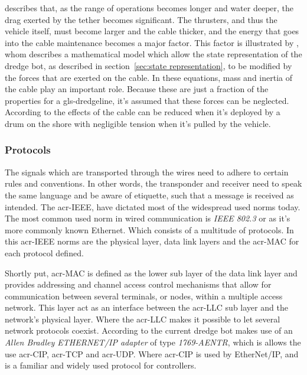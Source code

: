 \citet{westneat_advances_1983} describes that, as the range of operations becomes longer and water deeper, the drag exerted by the tether becomes significant. The thrusters, and thus the vehicle itself, must become larger and the cable thicker, and the energy that goes into the cable maintenance becomes a major factor. This factor is illustrated by \citet{fang_motions_2007}, whom describes a mathematical model which allow the state representation of the dredge bot, as described in section~\ref{sec:state representation}, to be modified by the forces that are exerted on the cable.
In these equations, mass and inertia of the cable play an important role. Because these are just a fraction of the properties for a \gls{gls-dredgeline}, it's assumed that these forces can be neglected. According to \citet{feng_evaluation_2004} the effects of the cable can be reduced when it's deployed by a drum on the shore with negligible tension when it's pulled by the vehicle.

\subsubsection*{Protocols}\label{sec:wired_protocols}
The signals which are transported through the wires need to adhere to certain rules and conventions. In other words, the transponder and receiver need to speak the same language and be aware of etiquette, such that a message is received as intended. The \gls{acr-IEEE}, have dictated most of the widespread used norms today. The most common used norm in wired communication is \textit{IEEE 802.3} or as it's more commonly known Ethernet. Which consists of a multitude of protocols. In this \gls{acr-IEEE} norms are the physical layer, data link layers and the \gls{acr-MAC} for each protocol defined.

Shortly put, \gls{acr-MAC} is defined as the lower sub layer of the data link layer and provides addressing and channel access control mechanisms that allow for communication between several terminals, or nodes, within a multiple access network. This layer act as an interface between the \gls{acr-LLC} sub layer and the network's physical layer. Where the \gls{acr-LLC} makes it possible to let several network protocols coexist.
According to \citet{jolectra_plc_2016} the current dredge bot makes use of an \textit{Allen Bradley ETHERNET/IP adapter} of type \textit{1769-AENTR}, which is allows the use \gls{acr-CIP}, \gls{acr-TCP} and \gls{acr-UDP}. Where \gls{acr-CIP} is used by EtherNet/IP, and is a familiar and widely used protocol for controllers.

